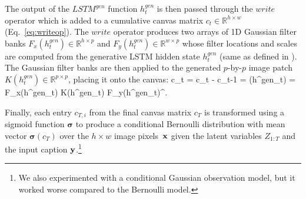 \documentclass{article} %
\newcommand{\Eqref}[1]{Eq.~\ref{#1}} %
\def\beqa#1\eeqa{\begin{eqnarray}#1\end{eqnarray}}
\newcommand{\sigmoid}{\boldsymbol{\sigma}}
\newcommand{\hdec}{h^{gen}}
\newcommand{\writeop}{\mathit{write}}
\newcommand{\decoder}{\mathit{LSTM}^{gen}}
\newcommand{\canv}{c}
\newcommand{\Lat}{Z}
\newcommand{\icaption}{{\bf{y}}}
\newcommand{\oimage}{{\bf{x}}}
\newcommand{\gFilterx}{F_x}
\newcommand{\gFiltery}{F_y}
\newcommand{\WriteFunc}{K}
\newcommand{\real}{\mathbb{R}}
\begin{document}
The output of the $\decoder$ function $\hdec_t$ is then passed through the $\writeop$ operator 
which is added to a cumulative canvas matrix $c_t \in \real^{h \times w}$ (\Eqref{eq:writeop}). 
The $\writeop$ operator produces two arrays of 1D Gaussian filter banks $\gFilterx(\hdec_t)\in\real^{h\times p}$ and $\gFiltery(\hdec_t)\in\real^{w\times p}$ whose filter locations and scales are computed from the generative LSTM hidden state $\hdec_t$ (same as defined in \cite{gregor_draw}). 
The Gaussian filter banks are then applied to the generated $p$-by-$p$ image patch $\WriteFunc(\hdec_t) \in \real^{p\times p}$, placing it onto the canvas:
\beqa
\label{eq:write}
\Delta \canv_{t} = \canv_{t} - \canv_{t-1} = \writeop(\hdec_t) = \gFilterx(\hdec_t) \WriteFunc(\hdec_t) \gFiltery(\hdec_t)^\top. 
\eeqa

Finally, each entry $\canv_{T,i}$ from the final canvas matrix $\canv_T$ is transformed using a sigmoid function $\sigmoid$ to produce a conditional Bernoulli 
distribution with mean vector $\sigmoid(\canv_{T})$ over the 
$h\times w$ image pixels~$\oimage$ given the latent variables 
$\Lat_{1:T}$ and the input caption $\icaption$.\footnote{We also experimented with a conditional Gaussian observation model, but
it worked worse compared to the Bernoulli model.}
\end{document}

